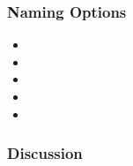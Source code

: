 \subsubsection{Naming Options}
\begin{itemize}
  \item {}
  \item {}
  \item {}
  \item {}
  \item {}
\end{itemize}

\subsubsection{Discussion}

